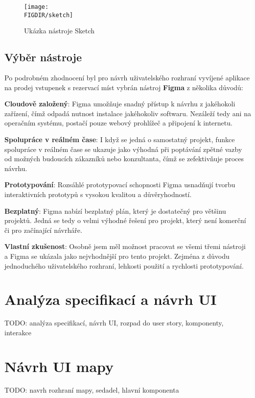 \begin{figure}[H]
    \centering
    \texttt{[image: \\FIGDIR/sketch]}
    \caption{Ukázka nástroje Sketch\cite{sketch}}
    \label{fig:sketch}
\end{figure}

\subsection{Výběr nástroje}
\label{subsec:navrh-ui-nastroje-vyber}
Po podrobném zhodnocení byl pro návrh uživatelského rozhraní vyvíjené aplikace na prodej vstupenek s rezervací míst vybrán nástroj \textbf{Figma} z několika důvodů:

\textbf{Cloudově založený}: Figma umožňuje snadný přístup k návrhu z jakéhokoli zařízení, čímž odpadá nutnost instalace jakéhokoliv softwaru.
Nezáleží tedy ani na operačním systému, postačí pouze webový prohlížeč a připojení k internetu.

\textbf{Spolupráce v reálném čase}: I když se jedná o samostatný projekt, funkce spolupráce v reálném čase se ukazuje jako výhodná při poptávání zpětné vazby od možných budoucích zákazníků nebo konzultanta, čímž se zefektivňuje proces návrhu.

\textbf{Prototypování}: Rozsáhlé prototypovací schopnosti Figma usnadňují tvorbu interaktivních prototypů s vysokou kvalitou a důvěryhodností.

\textbf{Bezplatný}: Figma nabízí bezplatný plán, který je dostatečný pro většinu projektů.
Jedná se tedy o velmi výhodné řešení pro projekt, který není komerční či pro začínající návrháře.

\textbf{Vlastní zkušenost}: Osobně jsem měl možnost pracovat se všemi třemi nástroji a Figma se ukázala jako nejvhodnější pro tento projekt.
Zejména z důvodu jednoduchého uživatelského rozhraní, lehkosti použití a rychlosti prototypování.

\section{Analýza specifikací a návrh UI}
\label{sec:navrh-ui-analyza}
TODO: analýza specifikací, návrh UI, rozpad do user story, komponenty, interakce

\section{Návrh UI mapy}
\label{sec:navrh-ui-mapa}
TODO: navrh rozhraní mapy, sedadel, hlavní komponenta
